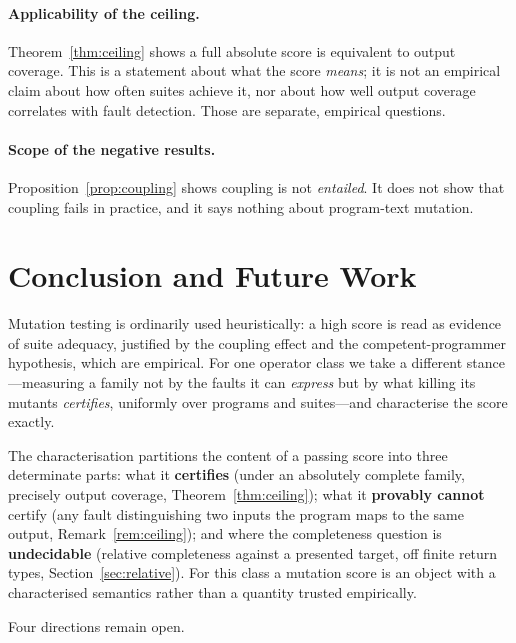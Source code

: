 \documentclass[runningheads,envcountsect,envcountsame]{llncs}
\begin{document}
\paragraph{Applicability of the ceiling.}
Theorem~\ref{thm:ceiling} shows a full absolute score is equivalent to output
coverage. This is a statement about what the score \emph{means}; it is not an
empirical claim about how often suites achieve it, nor about how well output
coverage correlates with fault detection. Those are separate, empirical
questions.

\paragraph{Scope of the negative results.}
Proposition~\ref{prop:coupling} shows coupling is not \emph{entailed}. It does
not show that coupling fails in practice, and it says nothing about program-text
mutation.

\section{Conclusion and Future Work}
\label{sec:conclusion}

Mutation testing is ordinarily used heuristically: a high score is read as
evidence of suite adequacy, justified by the coupling effect and the
competent-programmer hypothesis, which are empirical. For one operator class we
take a different stance---measuring a family not by the faults it can
\emph{express} but by what killing its mutants \emph{certifies}, uniformly over
programs and suites---and characterise the score exactly.

The characterisation partitions the content of a passing score into three
determinate parts: what it \textbf{certifies} (under an absolutely complete
family, precisely output coverage, Theorem~\ref{thm:ceiling}); what it
\textbf{provably cannot} certify (any fault distinguishing two inputs the program
maps to the same output, Remark~\ref{rem:ceiling}); and where the completeness
question is \textbf{undecidable} (relative completeness against a presented
target, off finite return types, Section~\ref{sec:relative}). For this class a
mutation score is an object with a characterised semantics rather than a quantity
trusted empirically.

Four directions remain open.
\end{document}
